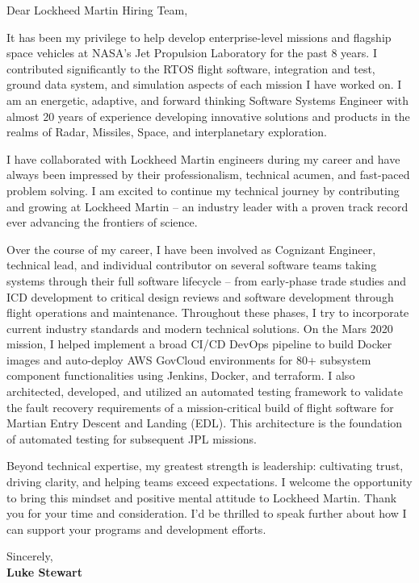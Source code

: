 \documentclass[a4paper,11pt]{letter}
\begin{document}

\normalsize Dear Lockheed Martin Hiring Team,

It has been my privilege to help develop enterprise-level missions and flagship space vehicles at NASA's Jet Propulsion Laboratory for the past 8 years. 
I contributed significantly to the RTOS flight software, integration and test, ground data system, and simulation aspects of each mission I have worked on.
I am an energetic, adaptive, and forward thinking Software Systems Engineer with almost 20 years of experience developing innovative solutions and products in the realms of Radar, Missiles, Space, and interplanetary exploration. 

\vspace{1pt}

I have collaborated with Lockheed Martin engineers during my career and have always been impressed by their professionalism, technical acumen, and fast-paced problem solving.
I am excited to continue my technical journey by contributing and growing at Lockheed Martin -- an industry leader with a proven track record ever advancing the frontiers of science. 

\vspace{1pt}

Over the course of my career, I have been involved as Cognizant Engineer, technical lead, and individual contributor on several software teams taking systems through their full software lifecycle -- from early-phase trade studies and ICD development to critical design reviews and software development through flight operations and maintenance. 
Throughout these phases, I try to incorporate current industry standards and modern technical solutions. 
On the Mars 2020 mission, I helped implement a broad CI/CD DevOps pipeline to build Docker images and auto-deploy AWS GovCloud environments for 80+ subsystem component functionalities using Jenkins, Docker, and terraform. 
I also architected, developed, and utilized an automated testing framework to validate the fault recovery requirements of a mission-critical build of flight software for Martian Entry Descent and Landing (EDL). This architecture is the foundation of automated testing for subsequent JPL missions.

\vspace{1pt}

Beyond technical expertise, my greatest strength is leadership: cultivating trust, driving clarity, and helping teams exceed expectations.
I welcome the opportunity to bring this mindset and positive mental attitude to Lockheed Martin.
Thank you for your time and consideration. 
I'd be thrilled to speak further about how I can support your programs and development efforts.

\bigskip
\noindent
Sincerely,\\
\textbf{Luke Stewart}
\end{document}
